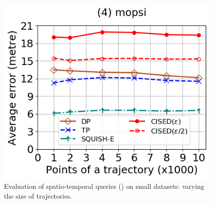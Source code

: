 \begin{figure}[tb!]
	\includegraphics[scale=0.320]{Figures/Exp-query-SED-error-size-mopsi.png}		
	\vspace{-2ex}
	\caption{\small Evaluation of spatio-temporal queries (\sed) on small datasets: varying the size of
		trajectories.}
	\label{fig:query-sed-size}
	\vspace{-2ex}
\end{figure}


